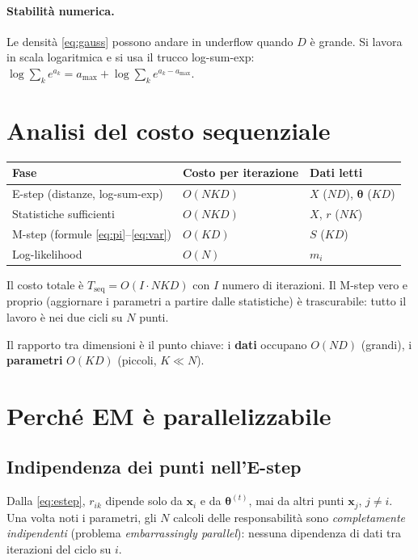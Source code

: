 \documentclass[11pt,a4paper]{article}
\newcommand{\bx}{\mathbf{x}}
\newcommand{\bth}{\boldsymbol{\theta}}
\theoremstyle{definition}
\begin{document}
\paragraph{Stabilità numerica.}
Le densità \eqref{eq:gauss} possono andare in underflow quando $D$ è grande. Si
lavora in scala logaritmica e si usa il trucco log-sum-exp:
$\log\sum_k e^{a_k}=a_{\max}+\log\sum_k e^{a_k-a_{\max}}$.

\section{Analisi del costo sequenziale}
\begin{center}
\begin{tabular}{lll}
\toprule
Fase & Costo per iterazione & Dati letti \\
\midrule
E-step (distanze, log-sum-exp) & $O(NKD)$ & $X$ ($ND$), $\bth$ ($KD$) \\
Statistiche sufficienti & $O(NKD)$ & $X$, $r$ ($NK$) \\
M-step (formule \eqref{eq:pi}--\eqref{eq:var}) & $O(KD)$ & $S$ ($KD$) \\
Log-likelihood & $O(N)$ & $m_i$ \\
\bottomrule
\end{tabular}
\end{center}
Il costo totale è $T_{\mathrm{seq}}=O(I\cdot NKD)$ con $I$ numero di iterazioni.
Il M-step vero e proprio (aggiornare i parametri a partire dalle statistiche) è
trascurabile: tutto il lavoro è nei due cicli su $N$ punti.

Il rapporto tra dimensioni è il punto chiave: i \textbf{dati} occupano $O(ND)$
(grandi), i \textbf{parametri} $O(KD)$ (piccoli, $K\ll N$).

\section{Perché EM è parallelizzabile}

\subsection{Indipendenza dei punti nell'E-step}
Dalla \eqref{eq:estep}, $r_{ik}$ dipende solo da $\bx_i$ e da $\bth^{(t)}$, mai da
altri punti $\bx_j$, $j\ne i$. Una volta noti i parametri, gli $N$ calcoli
delle responsabilità sono \emph{completamente indipendenti} (problema
\emph{embarrassingly parallel}): nessuna dipendenza di dati tra iterazioni del ciclo su $i$.
\end{document}
